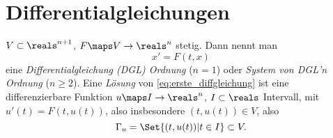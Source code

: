 \chapter{Differentialgleichungen}
\begin{definition}\label{dgl}
  \( V\subset \reals^{n+1} \), \( F\maps V\to \reals^n \) stetig. Dann nennt man
  \begin{equation*}
    x'=F(t,x)\tag{\(*\)}\label{eq:erste_diffgleichung}
  \end{equation*}
  eine \emph{Differentialgleichung (DGL)  Ordnung} (\( n=1 \)) oder \emph{System von DGL'n  Ordnung} (\( n\geq 2 \)). Eine \emph{Lösung} von \eqref{eq:erste_diffgleichung} ist eine differenzierbare Funktion \( u\maps I\to \reals^n \), \( I\subset \reals \) Intervall, mit \( u'(t)=F(t,u(t)) \), also insbesondere \( (t,u(t)) \in V\), also
  \begin{equation*}
    \Gamma_u=\Set{(t,u(t))|t\in I}\subset V.
  \end{equation*}
\end{definition}
